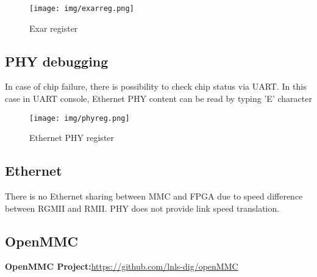 	\begin{figure}[htbp!]
		\centering
		\texttt{[image: img/exarreg.png]}\\
		\caption{Exar register } 
	\end{figure}	
\clearpage
\subsection{PHY debugging}

In case of chip failure, there is possibility to check chip status via UART. In this case in UART console, Ethernet PHY content can be read by typing 'E' character

	\begin{figure}[htbp!]
		\centering
		\texttt{[image: img/phyreg.png]}\\
		\caption{Ethernet PHY register } 
	\end{figure}

\subsection{Ethernet }

There is no Ethernet sharing between MMC and FPGA due to speed difference between RGMII and RMII. PHY does not provide link speed translation.

\subsection{OpenMMC}

\textbf{OpenMMC Project:}\href{https://github.com/lnls-dig/openMMC}{https://github.com/lnls-dig/openMMC}

